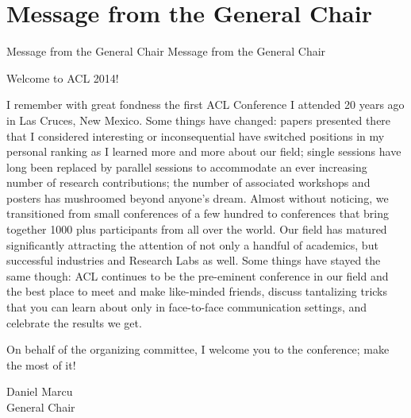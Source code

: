 \section{Message from the General Chair}\vspace{2em}
\setheaders%
    {Message from the General Chair}%
    {Message from the General Chair}
\thispagestyle{emptyheader}

\setlength{\parskip}{1ex}

\noindent Welcome to ACL 2014!

I remember with great fondness the first ACL Conference I attended 20 years ago in Las Cruces, New Mexico. Some things have changed: papers presented there that I considered interesting or inconsequential have switched positions in my personal ranking as I learned more and more about our field; single sessions have long been replaced by parallel sessions to accommodate an ever increasing number of research contributions; the number of associated workshops and posters has mushroomed beyond anyone's dream. Almost without noticing, we transitioned from small conferences of a few hundred to conferences that bring together 1000 plus participants from all over the world.  Our field has matured significantly attracting the attention of not only a handful of academics, but successful industries and Research Labs as well.  Some things have stayed the same though: ACL continues to be the pre-eminent conference in our field and the best place to meet and make like-minded friends, discuss tantalizing tricks that you can learn about only in face-to-face communication settings, and celebrate the results we get.

On behalf of the organizing committee, I welcome you to the conference; make the most of it!

\vspace{.2in}
Daniel Marcu \\
\indent General Chair

